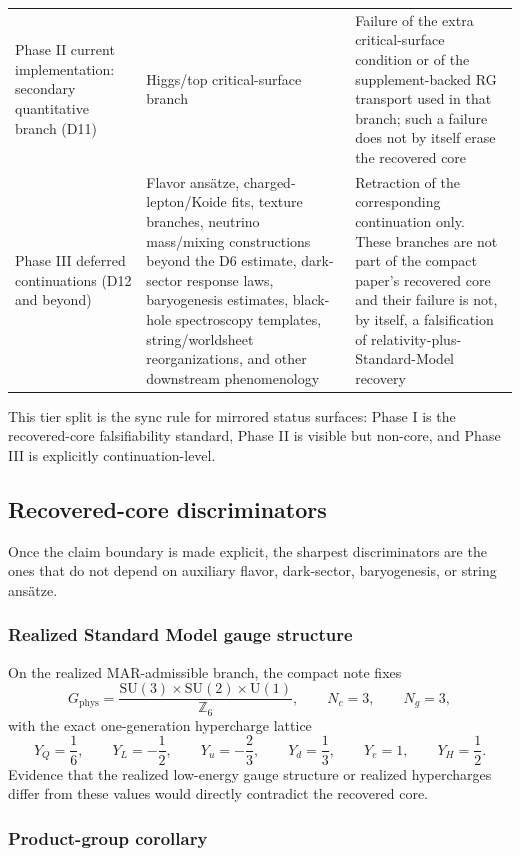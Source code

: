 \documentclass[11pt]{article}
\newcommand{\SU}{\mathrm{SU}}
\newcommand{\U}{\mathrm{U}}
\begin{document}
\begin{longtable}{@{}>{\raggedright\arraybackslash}p{}>{\raggedright\arraybackslash}p{}>{\raggedright\arraybackslash}p{}@{}}
Phase II current implementation: secondary quantitative branch (D11) & Higgs/top critical-surface branch & Failure of the extra critical-surface condition or of the supplement-backed RG transport used in that branch; such a failure does not by itself erase the recovered core \\
Phase III deferred continuations (D12 and beyond) & Flavor ans\"atze, charged-lepton/Koide fits, texture branches, neutrino mass/mixing constructions beyond the D6 estimate, dark-sector response laws, baryogenesis estimates, black-hole spectroscopy templates, string/worldsheet reorganizations, and other downstream phenomenology & Retraction of the corresponding continuation only. These branches are not part of the compact paper's recovered core and their failure is not, by itself, a falsification of relativity-plus-Standard-Model recovery \\
\end{longtable}
\endgroup

This tier split is the sync rule for mirrored status surfaces: Phase I is the recovered-core falsifiability standard, Phase II is visible but non-core, and Phase III is explicitly continuation-level.

\subsection{Recovered-core discriminators}

Once the claim boundary is made explicit, the sharpest discriminators are the ones that do not depend on auxiliary flavor, dark-sector, baryogenesis, or string ans\"atze.

\subsubsection{Realized Standard Model gauge structure}

On the realized MAR-admissible branch, the compact note fixes
\[
G_{\mathrm{phys}}=
\frac{\SU(3)\times\SU(2)\times\U(1)}{\mathbb Z_6},
\qquad
N_c=3,
\qquad
N_g=3,
\]
with the exact one-generation hypercharge lattice
\[
Y_Q=\frac16,\qquad
Y_L=-\frac12,\qquad
Y_u=-\frac23,\qquad
Y_d=\frac13,\qquad
Y_e=1,\qquad
Y_H=\frac12.
\]
Evidence that the realized low-energy gauge structure or realized hypercharges differ from these values would directly contradict the recovered core.

\subsubsection{Product-group corollary}
\end{document}

